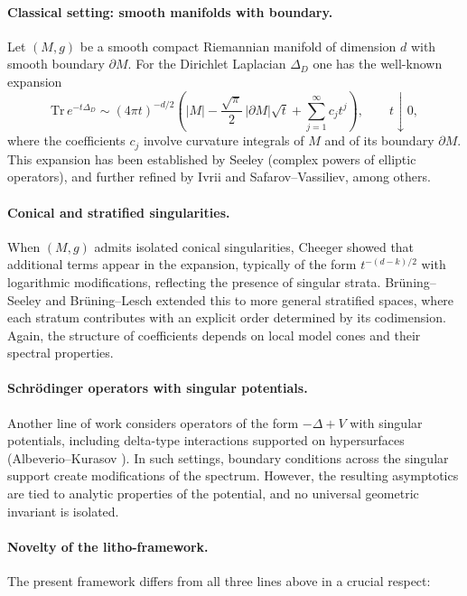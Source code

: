 \paragraph{Classical setting: smooth manifolds with boundary.}
Let $(M,g)$ be a smooth compact Riemannian manifold of dimension $d$
with smooth boundary $\partial M$.
For the Dirichlet Laplacian $\Delta_D$ one has the well-known expansion
\begin{equation}\label{eq:classical-heat-trace}
\mathrm{Tr}\,e^{-t\Delta_D} \sim (4\pi t)^{-d/2}
\left( |M| - \frac{\sqrt{\pi}}{2}\,|\partial M|\sqrt{t}
+ \sum_{j=1}^\infty c_j t^j \right), \qquad t\downarrow 0,
\end{equation}
where the coefficients $c_j$ involve curvature integrals
of $M$ and of its boundary $\partial M$.
This expansion has been established by Seeley (complex powers of elliptic operators),
and further refined by Ivrii and Safarov–Vassiliev, among others.

\paragraph{Conical and stratified singularities.}
When $(M,g)$ admits isolated conical singularities, Cheeger \cite{Cheeger}
showed that additional terms appear in the expansion,
typically of the form $t^{-(d-k)/2}$ with logarithmic modifications,
reflecting the presence of singular strata.
Brüning–Seeley \cite{BruningSeeley} and Brüning–Lesch \cite{BruningLesch}
extended this to more general stratified spaces, where each stratum
contributes with an explicit order determined by its codimension.
Again, the structure of coefficients depends on local model cones and
their spectral properties.

\paragraph{Schrödinger operators with singular potentials.}
Another line of work considers operators of the form
$-\Delta+V$ with singular potentials, including delta-type interactions
supported on hypersurfaces (Albeverio–Kurasov \cite{AlbeverioKurasov}).
In such settings, boundary conditions across the singular support
create modifications of the spectrum.
However, the resulting asymptotics are tied to analytic properties
of the potential, and no universal geometric invariant is isolated.

\paragraph{Novelty of the litho-framework.}
The present framework differs from all three lines above in a crucial respect:

